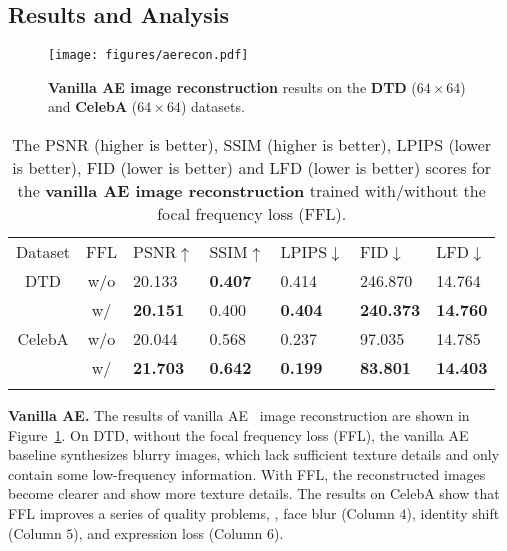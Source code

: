 \documentclass[10pt,twocolumn,letterpaper]{article}
\begin{document}
\subsection{Results and Analysis}
\label{sec:results}


\begin{figure}[t]
	\centering
\texttt{[image: figures/aerecon.pdf]}
\caption{\textbf{Vanilla AE image reconstruction} results on the \textbf{DTD} ($64 \times 64$) and \textbf{CelebA} ($64 \times 64$) datasets.}
	\label{fig:aerecon}
	\vspace{-0.1cm}
\end{figure}





\begin{table}[tb!]
\centering
\footnotesize
\caption{The PSNR (higher is better), SSIM (higher is better), LPIPS (lower is better), FID (lower is better) and LFD (lower is better) scores for the \textbf{vanilla AE image reconstruction} trained with/without the focal frequency loss (FFL).}
\begin{tabularx}{\linewidth}{c|c|*{5}{|Y}}
\Xhline{1pt}
Dataset& FFL & PSNR$\uparrow$& SSIM$\uparrow$& LPIPS$\downarrow$& FID$\downarrow$& LFD$\downarrow$ \\
\Xhline{0.6pt}
DTD& w/o & 20.133& {\bf0.407}& 0.414& 246.870& 14.764 \\
& w/ &  {\bf20.151}& 0.400& {\bf0.404}& {\bf240.373}& {\bf14.760} \\
\Xhline{0.6pt}
CelebA& w/o & 20.044& 0.568& 0.237& 97.035& 14.785 \\
& w/ &  {\bf21.703}& {\bf0.642}& {\bf0.199}& {\bf83.801}& {\bf14.403} \\
\Xhline{1pt}
\end{tabularx}
\label{tbl:vanillaae}
\vspace{-0.55cm}
\end{table}


\noindent
\textbf{Vanilla AE.}
The results of vanilla AE~\cite{ae} image reconstruction are shown in Figure~\ref{fig:aerecon}.
On DTD, without the focal frequency loss (FFL), the vanilla AE baseline synthesizes blurry images, which lack sufficient texture details and only contain some low-frequency information.
With FFL, the reconstructed images become clearer and show more texture details.
The results on CelebA show that FFL improves a series of quality problems, \eg, face blur (Column $4$), identity shift (Column $5$), and expression loss (Column $6$).
\end{document}
